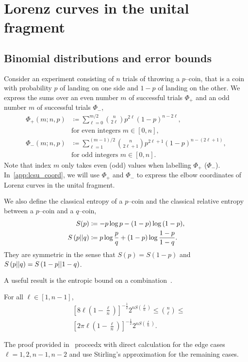 
\section{Lorenz curves in the unital fragment}
\label{app:lcsu_technical}

\subsection{Binomial distributions and error bounds}\label{app:phi}
Consider an experiment consisting of $n$ trials of throwing a $p$--coin, that is a coin with probability $p$ of landing on one side and $1-p$ of landing on the other.
We express the sums over an even number $m$ of successful trials $\Phi_+$ and an odd number $m$ of successful trials $\Phi_-$,
\begin{align}	
	\Phi_+(m; n, p) &\coloneqq \sum\limits_{\ell=0}^{m/2} \binom{n}{2\ell} p^{2\ell} (1-p)^{n-2\ell}, \nonumber\\ 
	&\text{for even integers } m\in[0,n], \label{eq:fp_app} \\
	\Phi_-(m; n, p) &\coloneqq \sum\limits_{\ell=1}^{(m-1)/2} \binom{n}{2\ell+1} p^{2\ell+1} (1-p)^{n-(2\ell+1)}, \nonumber\\ 
	&\text{for odd integers }m\in[0,n]. \label{eq:fn_app}
\end{align}
Note that index $m$ only takes even (odd) values when labelling $\Phi_+$ ($\Phi_-$).
In~\cref{app:lcsu_coord}, we will use $\Phi_+$ and $\Phi_-$ to express the elbow coordinates of Lorenz curves in the unital fragment.

We also define the classical entropy of a $p$--coin and the classical relative entropy between a $p$--coin and a $q$--coin,
\begin{align}
	S(p) &\coloneqq -p\log{p} -(1-p)\log{(1-p)}, \label{eq:ent}\\
	S\left( p \middle\vert\middle\vert q \right) &\coloneqq p \log{\frac{p}{q}} + (1-p) \log{\frac{1-p}{1-q}}. \label{eq:ent_rel}
\end{align}
They are symmetric in the sense that $S(p) = S(1-p)$ and $S\left( p \middle\vert\middle\vert q \right) = S\left( 1-p \middle\vert\middle\vert 1-q \right)$.

A useful result is the entropic bound on a combination~\cite{cit:ash}.
\begin{lemma}\label{lem:comb_bounds}
	For all $\ell\in [1,n-1]$,
	\begin{align}
		&\left[ 8\ell\left(1-\frac{\ell}{n}\right) \right]^{-\frac{1}{2}} 2^{n S\left(\frac{\ell}{n}\right)} \leq \binom{n}{\ell} \leq \\
		&\left[ 2\pi \ell\left(1-\frac{\ell}{n}\right) \right]^{-\frac{1}{2}} 2^{n S\left(\frac{\ell}{n}\right)}.
	\end{align}
\end{lemma}
The proof provided in~\cite{cit:ash} proceedx with direct calculation for the edge cases $\ell = 1,2, n-1, n-2$ and use Stirling's approximation for the remaining cases.

